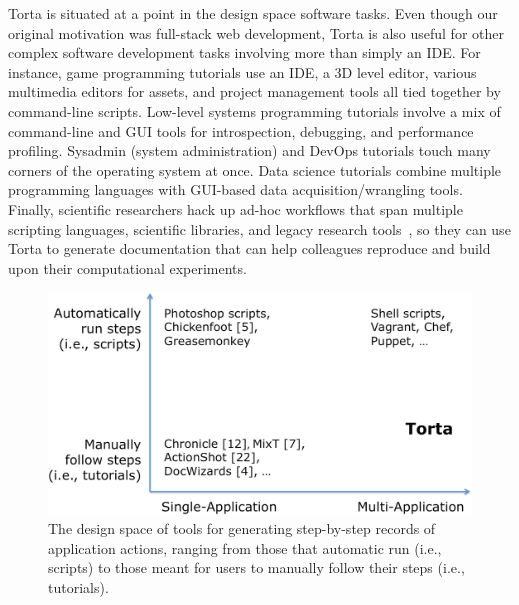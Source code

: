 Torta is situated at a point in the design space  software tasks.
%
%
Even though our original motivation was full-stack
web development, Torta is also useful for other complex software
development tasks involving more than simply an IDE. For instance,
game programming tutorials use an IDE, a 3D level editor, various
multimedia editors for assets, and project management tools all tied
together by command-line scripts. Low-level systems programming
tutorials involve a mix of command-line and GUI tools for introspection,
debugging, and performance profiling. Sysadmin (system administration)
and DevOps tutorials touch many corners of the operating system at once.
Data science tutorials combine multiple programming languages with
GUI-based data acquisition/wrangling tools. Finally, scientific
researchers hack up ad-hoc workflows that span multiple scripting
languages, scientific libraries, and legacy research
tools~\cite{GuoPhD2012}, so they can use Torta to generate documentation
that can help colleagues reproduce and build upon their computational
experiments.
%


\begin{figure}[h!]
\includegraphics[width=\columnwidth]{figures/torta/design-space.png}

\nocite{Bolin2005} %
\caption{The design space of tools for generating step-by-step records
of application actions, ranging from those that automatic run (i.e.,
scripts) to those meant for users to manually follow their steps (i.e.,
tutorials).}

\vspace{-0.5em} %
\label{fig:design-space}
\end{figure}


